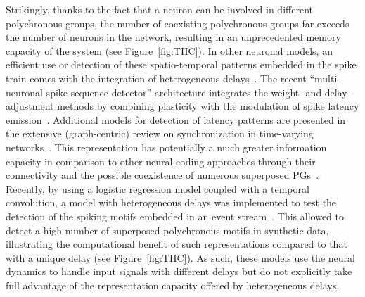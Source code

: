 \documentclass[brainsci, %
               review,accept,pdftex,moreauthors %
               ]{Definitions/mdpi}
\providecommand{\DIFadd}[1]{{\protect\color{blue}\uwave{#1}}} %
\providecommand{\DIFaddbegin}{} %
\providecommand{\DIFaddend}{} %
\newcommand{\DIFaddincludegraphics}[2][]{{\color{blue}\fbox{\DIFOincludegraphics[#1]{#2}}}} %
\DeclareRobustCommand{\DIFaddbegin}{\DIFOaddbegin \let\includegraphics\DIFaddincludegraphics} %
\DeclareRobustCommand{\DIFaddend}{\DIFOaddend \let\includegraphics\DIFOincludegraphics} %
\begin{document}
Strikingly, thanks to the fact that a neuron can be involved in different polychronous groups, the number of coexisting polychronous groups far exceeds the number of neurons in the network, resulting in an unprecedented memory capacity of the system (see Figure~\ref{fig:THC}). In other neuronal models, an efficient use or detection of these spatio-temporal patterns embedded in the spike train comes with the integration of heterogeneous delays~\citep{guise_bayesian_2014,zhang_supervised_2020}. The recent ``multi-neuronal spike sequence detector'' architecture integrates the weight- and delay-adjustment methods by combining plasticity with the modulation of spike latency emission~\citep{susi_nmnsd-spiking_2021}. Additional models for \DIFaddbegin \DIFadd{the }\DIFaddend detection of latency patterns are presented in the extensive (graph-centric) review on synchronization in time-varying networks~\citep{ghosh_synchronization_2021,ghosh_synchronized_2022}. This representation has potentially a much greater information capacity in comparison to other neural coding approaches through their connectivity and the possible coexistence of numerous superposed PGs~\citep{izhikevich_polychronous_2009}. Recently, by using a logistic regression model coupled with a temporal convolution, a model with heterogeneous delays was implemented to test the detection of the spiking motifs embedded in an event stream~\citep{grimaldi_learning_2022}. This allowed to detect a high number of superposed polychronous motifs in synthetic data, illustrating the computational benefit of such representations compared to that with a unique delay (see Figure~\ref{fig:THC}). As such, these models use the neural dynamics to handle input signals with different delays but do not explicitly take full advantage of the representation capacity offered by heterogeneous delays. 
\end{document}

